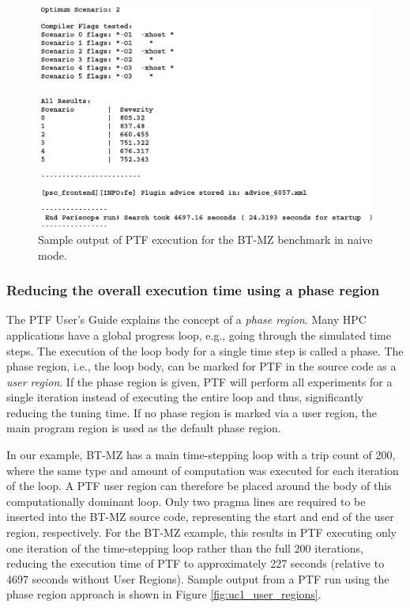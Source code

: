 \begin{figure}[H]
	\includegraphics[width=\textwidth]{../BPG/images/uc1_cfs_output.png}
	\caption{Sample output of PTF execution for the BT-MZ benchmark in naive mode.}
	\label{fig:uc1_cfs_output}
\end{figure}

\subsubsection{Reducing the overall execution time using a phase region}

The PTF User's Guide explains the concept of a \emph{phase region}. Many HPC applications have a global progress loop, e.g., going through the simulated time steps. The execution of the loop body for a single time step is called a phase. The phase region, i.e., the loop body, can be marked for PTF in the source code as a \emph{user region}. If the phase region is given, PTF will perform all experiments for a single iteration instead of executing the entire loop and thus, significantly reducing the tuning time. If no phase region is marked via a user region, the main program region is used as the default phase region. 

In our example, BT-MZ has a main time-stepping loop with a trip count of 200, where the same type and amount of computation was executed for each iteration of the loop.  A PTF user region can therefore be placed around the body of this computationally dominant loop. Only two pragma lines are required to be inserted into the BT-MZ source code, representing the start and end of the user region, respectively. For the BT-MZ example, this results in PTF executing only one iteration of the time-stepping loop rather than the full 200 iterations, reducing the execution time of PTF to approximately 227 seconds (relative to 4697 seconds without User Regions). Sample output from a PTF run using the phase region approach is shown in Figure \ref{fig:uc1_user_regions}.


